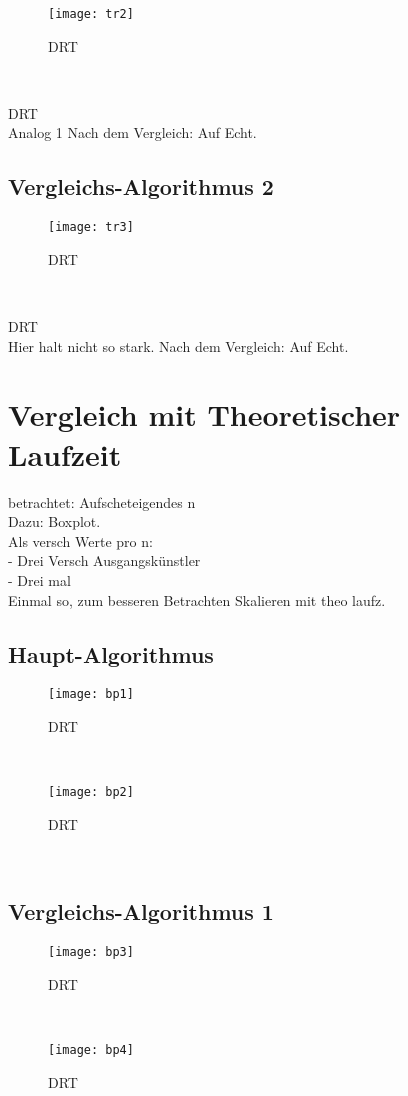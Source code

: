 \documentclass[
10pt, %
a4paper, %
oneside, %
headinclude,footinclude, %
BCOR5mm, %
]{scrartcl}
\begin{document}
\begin{figure}[h!]
	\centering 
	\texttt{[image: tr2]} 
	\caption[DRT]{DRT}
\end{figure}\

DRT\\
Analog 1
Nach dem Vergleich: Auf Echt.

\subsection{Vergleichs-Algorithmus 2}
\begin{figure}[h!]
	\centering 
	\texttt{[image: tr3]} 
	\caption[DRT]{DRT}
\end{figure}\


DRT\\
Hier halt nicht so stark.
Nach dem Vergleich: Auf Echt.

\section{Vergleich mit Theoretischer Laufzeit}

betrachtet: Aufscheteigendes n\\
Dazu: Boxplot.\\
Als versch Werte pro n:\\
- Drei Versch Ausgangskünstler\\
- Drei mal\\

Einmal so, zum besseren Betrachten Skalieren mit theo laufz.\\

\subsection{Haupt-Algorithmus}

\begin{figure}[h!]
	\centering 
	\texttt{[image: bp1]} 
	\caption[DRT]{DRT}
\end{figure}\
\begin{figure}[h!]
	\centering 
	\texttt{[image: bp2]} 
	\caption[DRT]{DRT}
\end{figure}\

\subsection{Vergleichs-Algorithmus 1}
\begin{figure}[h!]
	\centering 
	\texttt{[image: bp3]} 
	\caption[DRT]{DRT}
\end{figure}\
\begin{figure}[h!]
	\centering 
	\texttt{[image: bp4]} 
	\caption[DRT]{DRT}
\end{figure}\
\end{document}
